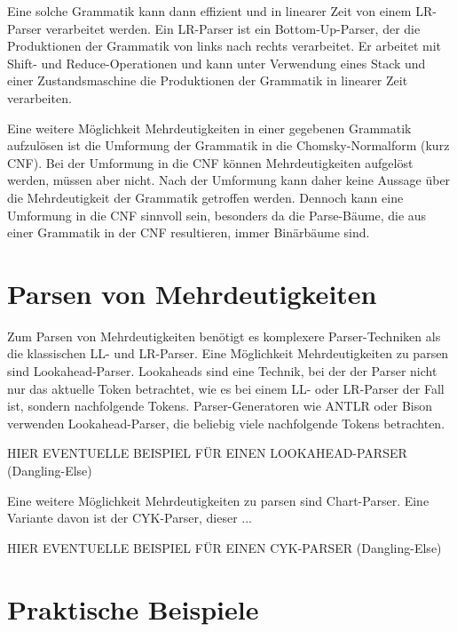 \documentclass[runningheads]{llncs}
\begin{document}
	Eine solche Grammatik kann dann effizient und in linearer Zeit von einem LR-Parser verarbeitet werden.
	Ein LR-Parser ist ein Bottom-Up-Parser, der die Produktionen der Grammatik von links nach rechts verarbeitet.
	Er arbeitet mit Shift- und Reduce-Operationen und kann unter Verwendung eines Stack und einer Zustandsmaschine
	die Produktionen der Grammatik in linearer Zeit verarbeiten.

	Eine weitere Möglichkeit Mehrdeutigkeiten in einer gegebenen Grammatik aufzulösen
	ist die Umformung der Grammatik in die Chomsky-Normalform (kurz CNF).
	Bei der Umformung in die CNF können Mehrdeutigkeiten aufgelöst werden, müssen aber nicht.
	Nach der Umformung kann daher keine Aussage über die Mehrdeutigkeit der Grammatik getroffen werden.
	Dennoch kann eine Umformung in die CNF sinnvoll sein, besonders da die Parse-Bäume,
	die aus einer Grammatik in der CNF resultieren, immer Binärbäume sind.


	\section{Parsen von Mehrdeutigkeiten}\label{sec:parsen-von-mehrdeutigkeiten}

	Zum Parsen von Mehrdeutigkeiten benötigt es komplexere Parser-Techniken als die klassischen LL- und LR-Parser.
	Eine Möglichkeit Mehrdeutigkeiten zu parsen sind Lookahead-Parser.
	Lookaheads sind eine Technik, bei der der Parser nicht nur das aktuelle Token betrachtet,
	wie es bei einem LL- oder LR-Parser der Fall ist, sondern nachfolgende Tokens.
	Parser-Generatoren wie ANTLR oder Bison verwenden Lookahead-Parser,
	die beliebig viele nachfolgende Tokens betrachten.

	HIER EVENTUELLE BEISPIEL FÜR EINEN LOOKAHEAD-PARSER (Dangling-Else)

	Eine weitere Möglichkeit Mehrdeutigkeiten zu parsen sind Chart-Parser.
	Eine Variante davon ist der CYK-Parser,
	dieser ...

	HIER EVENTUELLE BEISPIEL FÜR EINEN CYK-PARSER (Dangling-Else)

	\section{Praktische Beispiele}\label{sec:praktische-beispiele}
\end{document}
